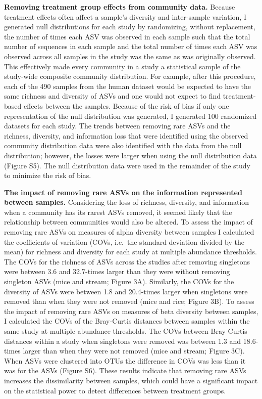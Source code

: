 \documentclass[
]{article}
\begin{document}
\textbf{Removing treatment group effects from community data.} Because
treatment effects often affect a sample's diversity and inter-sample
variation, I generated null distributions for each study by randomizing,
without replacement, the number of times each ASV was observed in each
sample such that the total number of sequences in each sample and the
total number of times each ASV was observed across all samples in the
study was the same as was originally observed. This effectively made
every community in a study a statistical sample of the study-wide
composite community distribution. For example, after this procedure,
each of the 490 samples from the human dataset would be expected to have
the same richness and diversity of ASVs and one would not expect to find
treatment-based effects between the samples. Because of the risk of bias
if only one representation of the null distribution was generated, I
generated 100 randomized datasets for each study. The trends between
removing rare ASVs and the richness, diversity, and information loss
that were identified using the observed community distribution data were
also identified with the data from the null distribution; however, the
losses were larger when using the null distribution data (Figure S5).
The null distribution data were used in the remainder of the study to
minimize the risk of bias.

\textbf{The impact of removing rare ASVs on the information represented
between samples.} Considering the loss of richness, diversity, and
information when a community has its rarest ASVs removed, it seemed
likely that the relationship between communities would also be altered.
To assess the impact of removing rare ASVs on measures of alpha
diversity between samples I calculated the coefficients of variation
(COVs, i.e.~the standard deviation divided by the mean) for richness and
diversity for each study at multiple abundance thresholds. The COVs for
the richness of ASVs across the studies after removing singletons were
between 3.6 and 32.7-times larger than they were without removing
singleton ASVs (mice and stream; Figure 3A). Similarly, the COVs for the
diversity of ASVs were between 1.8 and 20.4-times larger when singletons
were removed than when they were not removed (mice and rice; Figure 3B).
To assess the impact of removing rare ASVs on measures of beta diversity
between samples, I calculated the COVs of the Bray-Curtis distances
between samples within the same study at multiple abundance thresholds.
The COVs between Bray-Curtis distances within a study when singletons
were removed was between 1.3 and 18.6-times larger than when they were
not removed (mice and stream; Figure 3C). When ASVs were clustered into
OTUs the difference in COVs was less than it was for the ASVs (Figure
S6). These results indicate that removing rare ASVs increases the
dissimilarity between samples, which could have a significant impact on
the statistical power to detect differences between treatment groups.
\end{document}

